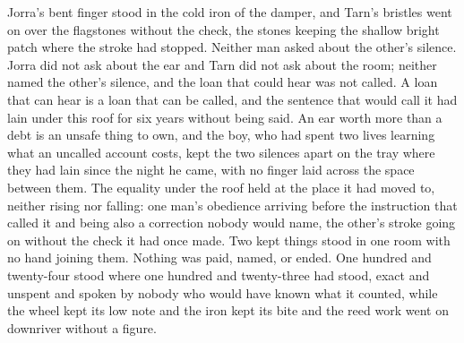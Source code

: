 Jorra's bent finger stood in the cold iron of the damper, and Tarn's bristles went on over the flagstones without the check, the stones keeping the shallow bright patch where the stroke had stopped. Neither man asked about the other's silence. Jorra did not ask about the ear and Tarn did not ask about the room; neither named the other's silence, and the loan that could hear was not called. A loan that can hear is a loan that can be called, and the sentence that would call it had lain under this roof for six years without being said. An ear worth more than a debt is an unsafe thing to own, and the boy, who had spent two lives learning what an uncalled account costs, kept the two silences apart on the tray where they had lain since the night he came, with no finger laid across the space between them. The equality under the roof held at the place it had moved to, neither rising nor falling: one man's obedience arriving before the instruction that called it and being also a correction nobody would name, the other's stroke going on without the check it had once made. Two kept things stood in one room with no hand joining them. Nothing was paid, named, or ended. One hundred and twenty-four stood where one hundred and twenty-three had stood, exact and unspent and spoken by nobody who would have known what it counted, while the wheel kept its low note and the iron kept its bite and the reed work went on downriver without a figure.
